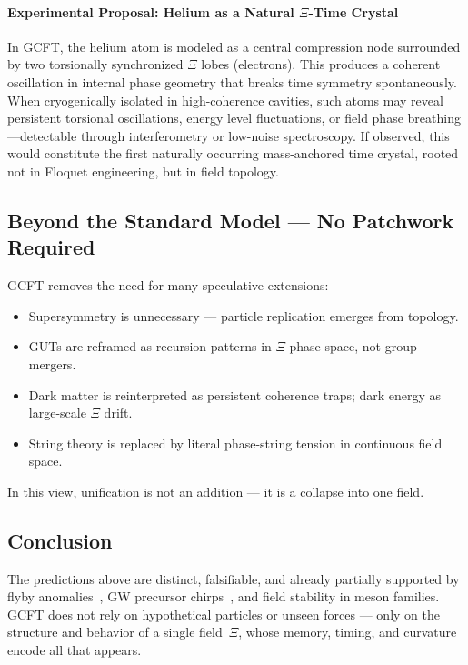 \paragraph{Experimental Proposal: Helium as a Natural $\Xi$-Time Crystal}

In GCFT, the helium atom is modeled as a central compression node surrounded by two torsionally synchronized $\Xi$ lobes (electrons). This produces a coherent oscillation in internal phase geometry that breaks time symmetry spontaneously. When cryogenically isolated in high-coherence cavities, such atoms may reveal persistent torsional oscillations, energy level fluctuations, or field phase breathing—detectable through interferometry or low-noise spectroscopy. If observed, this would constitute the first naturally occurring mass-anchored time crystal, rooted not in Floquet engineering, but in field topology.

\subsection{Beyond the Standard Model — No Patchwork Required}

GCFT removes the need for many speculative extensions:

\begin{itemize}
  \item Supersymmetry is unnecessary — particle replication emerges from topology.
  \item GUTs are reframed as recursion patterns in $\Xi$ phase-space, not group mergers.
  \item Dark matter is reinterpreted as persistent coherence traps; dark energy as large-scale $\Xi$ drift.
  \item String theory is replaced by literal phase-string tension in continuous field space.
\end{itemize}

In this view, unification is not an addition — it is a collapse into one field.

\subsection{Conclusion}

The predictions above are distinct, falsifiable, and already partially supported by flyby anomalies~\cite{Hacquier2025a}, GW precursor chirps~\cite{Hacquier2025c}, and field stability in meson families. GCFT does not rely on hypothetical particles or unseen forces — only on the structure and behavior of a single field~$\Xi$, whose memory, timing, and curvature encode all that appears.

